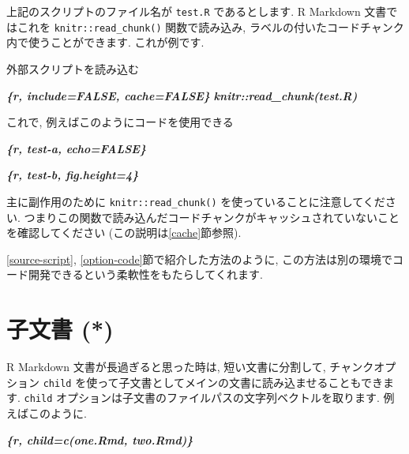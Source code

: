 \documentclass[
  11pt,
]{bxjsreport}
\newenvironment{Shaded}{\begin{snugshade}}{\end{snugshade}}
\newcommand{\InformationTok}[1]{\textcolor[rgb]{0.56,0.35,0.01}{\textbf{\textit{#1}}}}
\newcommand{\NormalTok}[1]{#1}
\begin{document}
上記のスクリプトのファイル名が \texttt{test.R} であるとします. R Markdown 文書ではこれを \texttt{knitr::read\_chunk()} 関数で読み込み, ラベルの付いたコードチャンク内で使うことができます. これが例です.

\begin{Shaded}
\begin{Highlighting}[]
\NormalTok{外部スクリプトを読み込む}

\InformationTok{\textasciigrave{}\textasciigrave{}\textasciigrave{}\{r, include=FALSE, cache=FALSE\}}
\InformationTok{knitr::read\_chunk(\textquotesingle{}test.R\textquotesingle{})}
\InformationTok{\textasciigrave{}\textasciigrave{}\textasciigrave{}}

\NormalTok{これで, 例えばこのようにコードを使用できる}

\InformationTok{\textasciigrave{}\textasciigrave{}\textasciigrave{}\{r, test{-}a, echo=FALSE\}}
\InformationTok{\textasciigrave{}\textasciigrave{}\textasciigrave{}}

\InformationTok{\textasciigrave{}\textasciigrave{}\textasciigrave{}\{r, test{-}b, fig.height=4\}}
\InformationTok{\textasciigrave{}\textasciigrave{}\textasciigrave{}}
\end{Highlighting}
\end{Shaded}

主に副作用のために \texttt{knitr::read\_chunk()} を使っていることに注意してください. つまりこの関数で読み込んだコードチャンクがキャッシュされていないことを確認してください (この説明は\ref{cache}節参照).

\ref{source-script}, \ref{option-code}節で紹介した方法のように, この方法は別の環境でコード開発できるという柔軟性をもたらしてくれます.

\hypertarget{child-document}{%
\section{子文書 (*)}\label{child-document}}

R Markdown 文書が長過ぎると思った時は, 短い文書に分割して, チャンクオプション \texttt{child} を使って子文書としてメインの文書に読み込ませることもできます. \texttt{child} オプションは子文書のファイルパスの文字列ベクトルを取ります. 例えばこのように.

\begin{Shaded}
\begin{Highlighting}[]
\InformationTok{\textasciigrave{}\textasciigrave{}\textasciigrave{}\{r, child=c(\textquotesingle{}one.Rmd\textquotesingle{}, \textquotesingle{}two.Rmd\textquotesingle{})\}}
\InformationTok{\textasciigrave{}\textasciigrave{}\textasciigrave{}}
\end{Highlighting}
\end{Shaded}
\end{document}
